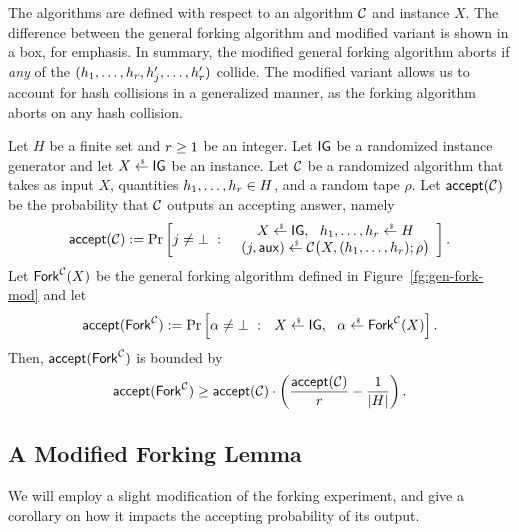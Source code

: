 The algorithms are defined with respect to an algorithm $\mathcal{C}$ and instance $X$.
The difference between the general forking algorithm and modified variant is shown in a box, for emphasis.
In summary,
the modified general forking algorithm aborts if \emph{any} of the $(h_1, \ldots, h_{r}, h_j', \ldots, h_{r}')$ collide.
The modified variant allows us to account for hash collisions in a generalized manner,
as the forking algorithm aborts on any hash collision.




\begin{lemma} \label{lem:forking-lemma}
Let $H$ be a finite set and $r \geq 1$ be an integer.
Let $\mathsf{IG}$ be a randomized instance generator and let $X \rgets \IG$ be an instance.
Let $\mathcal{C}$ be a randomized algorithm that takes as input $X$,
quantities $h_1,\ldots,h_{r} \in H$,
and a random tape $\rho$.
Let $\mathsf{accept}(\mathcal{C})$ be the probability that $\mathcal{C}$ outputs an accepting answer, namely
\[
\accept(\cdv) \deq
        \Pr\left[ j \neq \bot \ :\  \
               \begin{array}{c}
                               X \rgets \IG, \ \
                               h_1, \ldots, h_\forkhashes  \rgets H  \\
                               (j, \auxstring) \rgets \cdv\bigl(X, (h_1, \ldots, h_\forkhashes); \rho\bigr)
                \end{array}
            \right].
\]
Let $\mathsf{Fork}^{\mathcal{C}}(X)$ be the general forking algorithm defined in Figure~\ref{fg:gen-fork-mod} and let
\[
\accept(\genfork^\cdv) \deq
        \Pr\left[ \alpha \neq \bot \ :\  \   X \rgets \IG,\ \ \alpha \rgets \genfork^\cdv(X)  \right].
\]
Then,  $\mathsf{accept}(\mathsf{Fork}^{\mathcal{C}})$ is bounded by
\[
    \mathsf{accept}(\mathsf{Fork}^{\mathcal{C}})  \geq \mathsf{accept}(\mathcal{C}) \cdot \left(\frac{\mathsf{accept}(\mathcal{C}) }{r} -\frac{1}{\left\lvert H\right\rvert} \right).
\]
\end{lemma}


\subsection{A Modified Forking Lemma}
\label{sec:modified-forking}
We will employ a slight modification of the forking experiment,
and give a corollary on how it impacts the accepting probability of its output.


